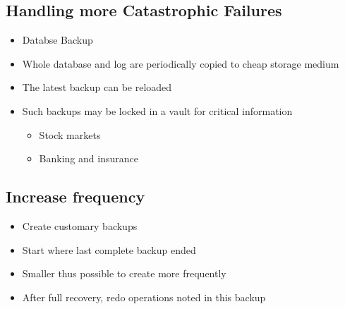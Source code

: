 \subsection{Handling more Catastrophic Failures}
\begin{itemize}
	\item Databse Backup
	\item Whole database and log are periodically copied to cheap storage medium
	\item The latest backup can be reloaded
	\item Such backups may be locked in a vault for critical information
	\begin{itemize}
		\item Stock markets
		\item Banking and insurance
	\end{itemize}
\end{itemize}
\subsection{Increase frequency}
\begin{itemize}
	\item Create customary backups
	\item Start where last complete backup ended
	\item Smaller thus possible to create more frequently
	\item After full recovery, redo operations noted in this backup
\end{itemize}


